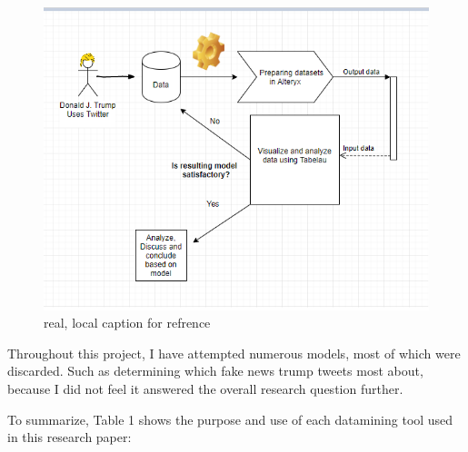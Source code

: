 \documentclass[11pt]{article}
\begin{document}
\begin{figure}[H] %
	\centering %
\includegraphics [scale= .85]  {SygModel.PNG}    %
	\caption[Optional caption] {real, local caption for refrence}
	\label{fig:wordcloudBliz}

\end{figure}


Throughout this project, I have attempted numerous models, most of which were discarded. Such as determining which fake news trump tweets most about, because I did not feel it answered the overall research question further.











 To summarize, Table 1 shows the purpose and use of each datamining tool used in this research paper: 
\end{document}
